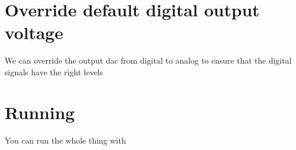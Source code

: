 \begin{Shaded}
\begin{Highlighting}[]


\ExtensionTok{*}
\OperatorTok{\textless{}}\OperatorTok{\textgreater{}}
\OperatorTok{\textless{}}\OperatorTok{\textgreater{}}
\OperatorTok{\textless{}}\OperatorTok{\textgreater{}}
\OperatorTok{\textless{}}\OperatorTok{\textgreater{}}
\OperatorTok{\textless{}}\OperatorTok{\textgreater{}}

\end{Highlighting}
\end{Shaded}

\section{Override default digital output
voltage}\label{override-default-digital-output-voltage}

We can override the output dac from digital to analog to ensure that the
digital signals have the right levels

\begin{Shaded}
\begin{Highlighting}[]

\ExtensionTok{*{-}}
     \ExtensionTok{+} \ErrorTok{(} 
     \ExtensionTok{+}    \KeywordTok{)}
\end{Highlighting}
\end{Shaded}

\section{Running}\label{running}

You can run the whole thing with

